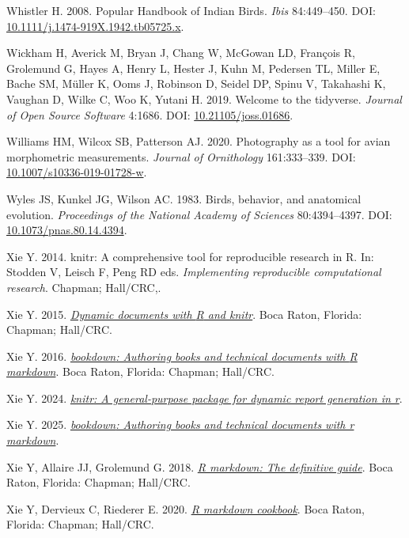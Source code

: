 \documentclass[10pt,a4paper]{article}
\newlength{\cslhangindent}
\newenvironment{CSLReferences}[2] %
 {\begin{list}{}{%
  \setlength{\itemindent}{0pt}
  \setlength{\leftmargin}{0pt}
  \setlength{\parsep}{0pt}
  \ifodd #1
   \setlength{\leftmargin}{\cslhangindent}
   \setlength{\itemindent}{-1\cslhangindent}
  \fi
  \setlength{\itemsep}{#2\baselineskip}}}
 {\end{list}}
\begin{document}
\begin{CSLReferences}{1}{0}
Whistler H. 2008. Popular {Handbook} of {Indian} {Birds}. \emph{Ibis} 84:449--450. DOI: \href{https://doi.org/10.1111/j.1474-919X.1942.tb05725.x}{10.1111/j.1474-919X.1942.tb05725.x}.

Wickham H, Averick M, Bryan J, Chang W, McGowan LD, François R, Grolemund G, Hayes A, Henry L, Hester J, Kuhn M, Pedersen TL, Miller E, Bache SM, Müller K, Ooms J, Robinson D, Seidel DP, Spinu V, Takahashi K, Vaughan D, Wilke C, Woo K, Yutani H. 2019. Welcome to the {tidyverse}. \emph{Journal of Open Source Software} 4:1686. DOI: \href{https://doi.org/10.21105/joss.01686}{10.21105/joss.01686}.

Williams HM, Wilcox SB, Patterson AJ. 2020. Photography as a tool for avian morphometric measurements. \emph{Journal of Ornithology} 161:333--339. DOI: \href{https://doi.org/10.1007/s10336-019-01728-w}{10.1007/s10336-019-01728-w}.

Wyles JS, Kunkel JG, Wilson AC. 1983. Birds, behavior, and anatomical evolution. \emph{Proceedings of the National Academy of Sciences} 80:4394--4397. DOI: \href{https://doi.org/10.1073/pnas.80.14.4394}{10.1073/pnas.80.14.4394}.

Xie Y. 2014. {knitr}: A comprehensive tool for reproducible research in {R}. In: Stodden V, Leisch F, Peng RD eds. \emph{Implementing reproducible computational research}. Chapman; Hall/CRC,.

Xie Y. 2015. \emph{\href{https://yihui.org/knitr/}{Dynamic documents with {R} and knitr}}. Boca Raton, Florida: Chapman; Hall/CRC.

Xie Y. 2016. \emph{\href{https://bookdown.org/yihui/bookdown}{{bookdown}: Authoring books and technical documents with {R} markdown}}. Boca Raton, Florida: Chapman; Hall/CRC.

Xie Y. 2024. \emph{\href{https://yihui.org/knitr/}{{knitr}: A general-purpose package for dynamic report generation in r}}.

Xie Y. 2025. \emph{\href{https://github.com/rstudio/bookdown}{{bookdown}: Authoring books and technical documents with r markdown}}.

Xie Y, Allaire JJ, Grolemund G. 2018. \emph{\href{https://bookdown.org/yihui/rmarkdown}{R markdown: The definitive guide}}. Boca Raton, Florida: Chapman; Hall/CRC.

Xie Y, Dervieux C, Riederer E. 2020. \emph{\href{https://bookdown.org/yihui/rmarkdown-cookbook}{R markdown cookbook}}. Boca Raton, Florida: Chapman; Hall/CRC.

\end{CSLReferences}
\end{document}
